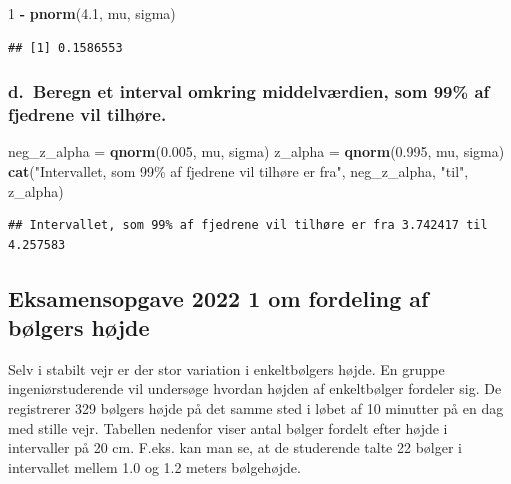 \documentclass[
]{article}
\newenvironment{Shaded}{\begin{snugshade}}{\end{snugshade}}
\newcommand{\DecValTok}[1]{\textcolor[rgb]{0.00,0.00,0.81}{#1}}
\newcommand{\FloatTok}[1]{\textcolor[rgb]{0.00,0.00,0.81}{#1}}
\newcommand{\FunctionTok}[1]{\textcolor[rgb]{0.13,0.29,0.53}{\textbf{#1}}}
\newcommand{\NormalTok}[1]{#1}
\newcommand{\OtherTok}[1]{\textcolor[rgb]{0.56,0.35,0.01}{#1}}
\newcommand{\SpecialCharTok}[1]{\textcolor[rgb]{0.81,0.36,0.00}{\textbf{#1}}}
\newcommand{\StringTok}[1]{\textcolor[rgb]{0.31,0.60,0.02}{#1}}
\begin{document}
\begin{Shaded}
\begin{Highlighting}[]
\DecValTok{1} \SpecialCharTok{{-}} \FunctionTok{pnorm}\NormalTok{(}\FloatTok{4.1}\NormalTok{, mu, sigma)}
\end{Highlighting}
\end{Shaded}

\begin{verbatim}
## [1] 0.1586553
\end{verbatim}

\subsubsection{d.~Beregn et interval omkring middelværdien, som 99\% af
fjedrene vil
tilhøre.}\label{d.-beregn-et-interval-omkring-middelvuxe6rdien-som-99-af-fjedrene-vil-tilhuxf8re.}

\begin{Shaded}
\begin{Highlighting}[]
\NormalTok{neg\_z\_alpha }\OtherTok{=} \FunctionTok{qnorm}\NormalTok{(}\FloatTok{0.005}\NormalTok{, mu, sigma)}
\NormalTok{z\_alpha }\OtherTok{=} \FunctionTok{qnorm}\NormalTok{(}\FloatTok{0.995}\NormalTok{, mu, sigma)}
\FunctionTok{cat}\NormalTok{(}\StringTok{"Intervallet, som 99\% af fjedrene vil tilhøre er fra"}\NormalTok{, neg\_z\_alpha, }\StringTok{"til"}\NormalTok{, z\_alpha)}
\end{Highlighting}
\end{Shaded}

\begin{verbatim}
## Intervallet, som 99% af fjedrene vil tilhøre er fra 3.742417 til 4.257583
\end{verbatim}

\subsection{\texorpdfstring{\textbf{Eksamensopgave} 2022 1 om fordeling
af bølgers
højde}{Eksamensopgave 2022 1 om fordeling af bølgers højde}}\label{eksamensopgave-2022-1-om-fordeling-af-buxf8lgers-huxf8jde}

Selv i stabilt vejr er der stor variation i enkeltbølgers højde. En
gruppe ingeniørstuderende vil undersøge hvordan højden af enkeltbølger
fordeler sig. De registrerer 329 bølgers højde på det samme sted i løbet
af 10 minutter på en dag med stille vejr. Tabellen nedenfor viser antal
bølger fordelt efter højde i intervaller på 20 cm. F.eks. kan man se, at
de studerende talte 22 bølger i intervallet mellem 1.0 og 1.2 meters
bølgehøjde.
\end{document}
